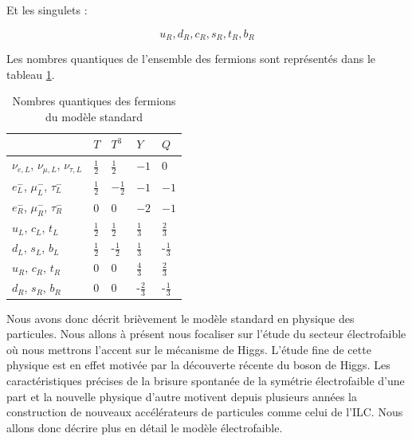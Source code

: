 Et les singulets :

\[ u_R,d_R,c_R,s_R,t_R,b_R \]

Les nombres quantiques de l'ensemble des fermions sont repr\'esent\'es dans le 
tableau \ref{tab:nbQuantiques}.

\medskip

\begin{table}
\begin{center}
\begin{tabular}{|l|l|l|l|l|} \hline
                                            & $T$           & $T^3$          & $Y$            & $Q$            \\ \hline
 $\nu_{e,L}$, $\nu_{\mu,L}$, $\nu_{\tau,L}$ & $\frac{1}{2}$ & $\frac{1}{2}$  & $-1$           & $0$            \\ \hline
 $e^-_L$, $\mu^-_L$, $\tau^-_L$             & $\frac{1}{2}$ & $-\frac{1}{2}$ & $-1$           & $-1$           \\ \hline
 $e^-_R$, $\mu^-_R$, $\tau^-_R$             & $0$           & $0$            & $-2$           & $-1$           \\ \hline
 $u_L$, $c_L$, $t_L$                        & $\frac{1}{2}$ & $\frac{1}{2}$  & $\frac{1}{3}$  & $\frac{2}{3}$  \\ \hline
 $d_L$, $s_L$, $b_L$                        & $\frac{1}{2}$ & -$\frac{1}{2}$ & $\frac{1}{3}$  & -$\frac{1}{3}$ \\ \hline
 $u_R$, $c_R$, $t_R$                        & $0$           & $0$            & $\frac{4}{3}$  & $\frac{2}{3}$  \\ \hline
 $d_R$, $s_R$, $b_R$                        & $0$           & $0$            & -$\frac{2}{3}$ & -$\frac{1}{3}$ \\ \hline
\end{tabular}
\caption{Nombres quantiques des fermions du mod\`ele standard}
\label{tab:nbQuantiques}
\end{center}
\end{table}

 Nous avons donc d\'ecrit brièvement le mod\`ele standard en physique des particules. Nous allons \`a pr\'esent nous focaliser sur l'\'etude du secteur \'electrofaible o\`u nous mettrons l'accent sur le m\'ecanisme de Higgs. L'\'etude fine de cette physique est en effet motiv\'ee par la d\'ecouverte r\'ecente du boson de Higgs. Les caract\'eristiques pr\'ecises de la brisure spontan\'ee de la sym\'etrie \'electrofaible d'une part et la nouvelle physique d'autre motivent depuis plusieurs ann\'ees la construction de nouveaux acc\'el\'erateurs de particules comme celui de l'ILC. Nous allons donc d\'ecrire plus en d\'etail le mod\`ele \'electrofaible.

